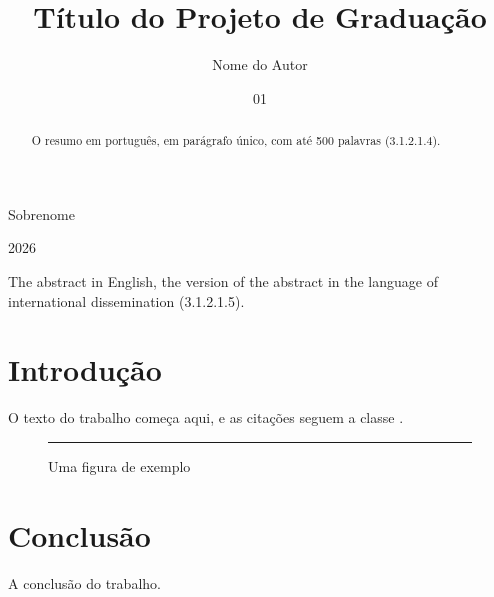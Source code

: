 \documentclass[grad]{ufrj}
\begin{document}
  \title{Título do Projeto de Graduação}
  \author{Nome do Autor}{Sobrenome}
  \date{01}{2026}

  \maketitle
  \frontmatter
  \begin{abstract}
    O resumo em português, em parágrafo único, com até 500 palavras
    (3.1.2.1.4).
  \end{abstract}
  \begin{foreignabstract}
    The abstract in English, the version of the abstract in the language of
    international dissemination (3.1.2.1.5).
  \end{foreignabstract}
  \listoffigures
  \tableofcontents

  \mainmatter
  \chapter{Introdução}
  O texto do trabalho começa aqui, e as citações seguem a classe
  \cite{m-4211}.

  \begin{figure}[ht]
    \caption{Uma figura de exemplo}
    \centering
    \rule{6cm}{3cm}
  \end{figure}

  \chapter{Conclusão}
  A conclusão do trabalho.

  \backmatter
  \printbibliography
\end{document}
